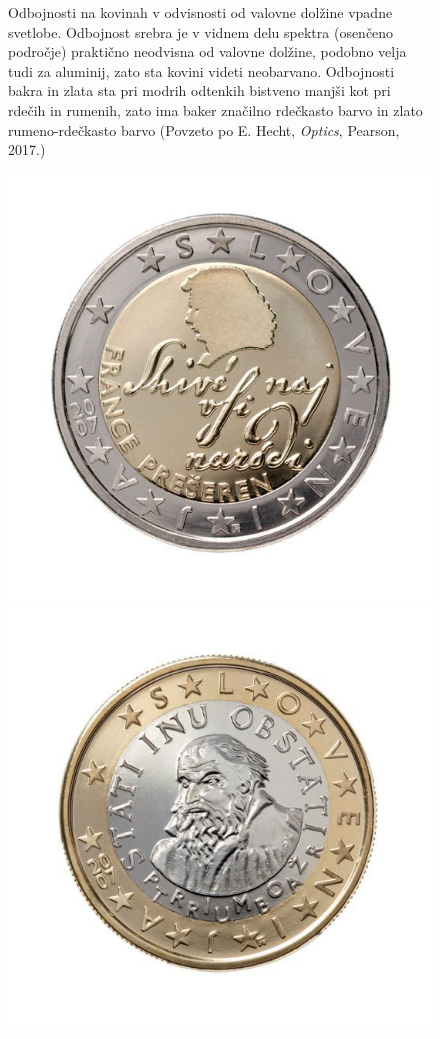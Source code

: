 \begin{figure}[h!]
\centering
\def\svgwidth{100truemm} 

\caption{Odbojnosti na kovinah v odvisnosti od valovne dolžine vpadne svetlobe. Odbojnost
srebra je v vidnem delu spektra (osenčeno področje) praktično 
neodvisna od valovne dolžine, podobno velja tudi za aluminij, zato sta kovini
videti neobarvano. Odbojnosti bakra in zlata sta pri modrih odtenkih bistveno 
manjši kot pri rdečih in rumenih, zato ima baker značilno rdečkasto barvo in zlato
rumeno-rdečkasto barvo (Povzeto po E. Hecht, {\it Optics}, Pearson, 2017.)}
\label{fig:09_kovine}
\end{figure}
\begin{figure}[h!]
\centering
\includegraphics[width=35truemm]{slike/09_2euro.jpg}
\includegraphics[width=35truemm]{slike/09_1euro.jpg}

\end{figure}
